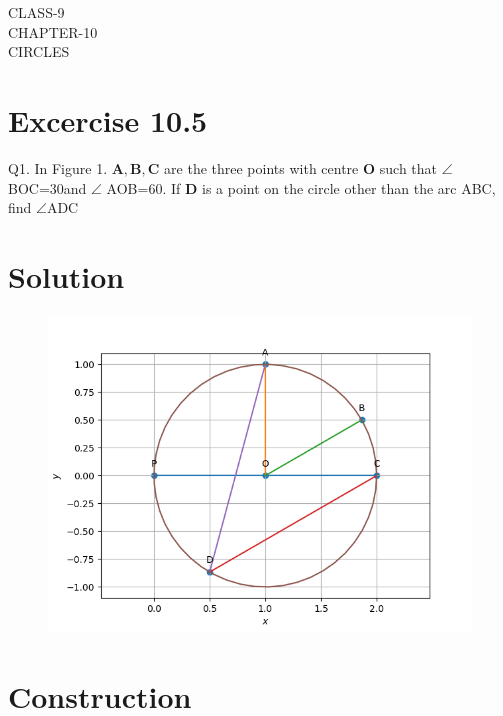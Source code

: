 \documentclass[12pt]{article}
\let\vec\mathbf
\begin{document}
\begin{center}
\textbf\large{CLASS-9\\CHAPTER-10 \\ CIRCLES}

\end{center}
\section*{Excercise 10.5}

Q1. In Figure 1. $\vec{A},\vec{B},\vec{C}$ are the three points with centre $\vec{O}$ such that $\angle$ BOC=30\degree and $\angle$ AOB=60\degree. If $\vec{D}$ is a point on the circle other than the arc ABC, find $\angle$ADC
\section*{\large Solution}
\begin{figure}[h!]
\centering
\includegraphics[width=\columnwidth]{figs/circle2.png}
\caption{}
\label{fig:Fig1}
\end{figure}
\section*{\large Construction}

\begin{table}[ht!]

\caption{}
\label{Table-1} 
\end{table}
\end{document}
